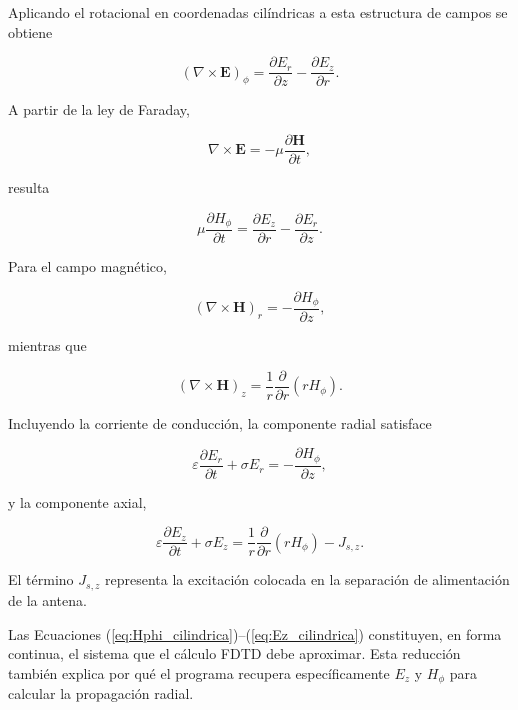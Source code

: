 Aplicando el rotacional en coordenadas cilíndricas a esta estructura de campos se obtiene

\begin{equation}
(\nabla\times\mathbf{E})_\phi
=
\frac{\partial E_r}{\partial z}
-
\frac{\partial E_z}{\partial r}.
\end{equation}

A partir de la ley de Faraday,

\begin{equation}
\nabla\times\mathbf{E}
=
-\mu\frac{\partial\mathbf{H}}{\partial t},
\end{equation}

resulta

\begin{equation}
\mu
\frac{\partial H_\phi}{\partial t}
=
\frac{\partial E_z}{\partial r}
-
\frac{\partial E_r}{\partial z}.
\label{eq:Hphi_cilindrica}
\end{equation}

Para el campo magnético,

\begin{equation}
(\nabla\times\mathbf{H})_r
=
-\frac{\partial H_\phi}{\partial z},
\end{equation}

mientras que

\begin{equation}
(\nabla\times\mathbf{H})_z
=
\frac{1}{r}
\frac{\partial}{\partial r}
\left(
rH_\phi
\right).
\end{equation}

Incluyendo la corriente de conducción, la componente radial satisface

\begin{equation}
\varepsilon
\frac{\partial E_r}{\partial t}
+
\sigma E_r
=
-\frac{\partial H_\phi}{\partial z},
\label{eq:Er_cilindrica}
\end{equation}

y la componente axial,

\begin{equation}
\varepsilon
\frac{\partial E_z}{\partial t}
+
\sigma E_z
=
\frac{1}{r}
\frac{\partial}{\partial r}
\left(
rH_\phi
\right)
-
J_{s,z}.
\label{eq:Ez_cilindrica}
\end{equation}

El término $J_{s,z}$ representa la excitación colocada en la separación de alimentación de la antena.

Las Ecuaciones (\ref{eq:Hphi_cilindrica})--(\ref{eq:Ez_cilindrica}) constituyen, en forma continua, el sistema que el cálculo FDTD debe aproximar. Esta reducción también explica por qué el programa recupera específicamente $E_z$ y $H_\phi$ para calcular la propagación radial.

